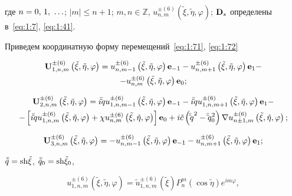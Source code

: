 \noindent где $n = 0,{\mkern 1mu} {\kern 1pt} 1,{\mkern 1mu} {\kern 1pt}  \ldots $; $|m| \le n + 1$; $m,n\in\mathbb{Z}$, $u_{n,m}^{ \pm (6)}\left( {\tilde \xi ,\tilde \eta ,\varphi } \right)$; ${{\bf{D}}_s}$ определены в~\eqref{eq:1:7}, \eqref{eq:1:41}.

Приведем координатную форму перемещений~\eqref{eq:1:71}, \eqref{eq:1:72}

\begin{multline}\label{eq:1:73}
{\bf{U}}_{1,n,m}^{ \pm (6)}\left( {\tilde \xi ,\tilde \eta ,\varphi } \right) = u_{n,m - 1}^{ \pm (6)}\left( {\tilde \xi ,\tilde \eta ,\varphi } \right){{\bf{e}}_{ - 1}} - u_{n,m + 1}^{ \pm (6)}\left( {\tilde \xi ,\tilde \eta ,\varphi } \right){{\bf{e}}_1} - \\
- u_{n,m}^{ \pm (6)}\left( {\tilde \xi ,\tilde \eta ,\varphi } \right){{\bf{e}}_0};
\end{multline}

\begin{multline}\label{eq:1:74}
{\bf{U}}_{2,n,m}^{ \pm (6)}\left( {\tilde \xi ,\tilde \eta ,\varphi } \right) = i\bar \tilde qu_{1,n,m - 1}^{ \pm (6)}\left( {\tilde \xi ,\tilde \eta ,\varphi } \right){{\bf{e}}_{ - 1}} - i\bar \tilde qu_{1,n,m + 1}^{ \pm (6)}\left( {\tilde \xi ,\tilde \eta ,\varphi } \right){{\bf{e}}_1} - \\
- \left[ {i\bar \tilde qu_{1,n,m}^{ \pm (6)}\left( {\tilde \xi ,\tilde \eta ,\varphi } \right) + \chi u_{n,m}^{ \pm (6)}\left( {\tilde \xi ,\tilde \eta ,\varphi } \right)} \right]{{\bf{e}}_0} + i\tilde c\left( {{{\bar \tilde q}^2} - \bar \tilde q_0^2} \right)\nabla u_{n \pm 1,m}^{ \pm (6)}\left( {\tilde \xi ,\tilde \eta ,\varphi } \right);
\end{multline}

\begin{equation}\label{eq:1:75}
{\bf{U}}_{3,n,m}^{ \pm (6)}\left( {\tilde \xi ,\tilde \eta ,\varphi } \right) =  - u_{n,m - 1}^{ \pm (6)}\left( {\tilde \xi ,\tilde \eta ,\varphi } \right){{\bf{e}}_{ - 1}} - u_{n,m + 1}^{ \pm (6)}\left( {\tilde \xi ,\tilde \eta ,\varphi } \right){{\bf{e}}_1};
\end{equation}

\noindent $\bar{\tilde q} = {\mathop{\rm sh}\nolimits} \tilde\xi $, ${\bar{\tilde q}_0} = {\mathop{\rm sh}\nolimits} {\tilde \xi _0}$,

\begin{equation}\label{eq:1:76}
u_{1,n,m}^{ \pm (6)}\left( {\tilde \xi ,\tilde \eta ,\varphi } \right) = \tilde u_{1,n,m}^{ \pm (6)}(\tilde \xi )P_n^m(\cos \tilde \eta ){e^{im\varphi }},
\end{equation}

